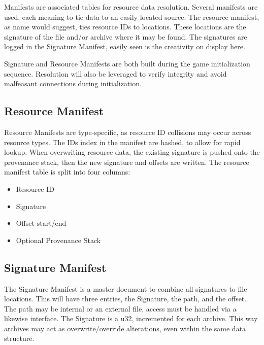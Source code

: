Manifests are associated tables for resource data resolution. Several manifests are used, each meaning to tie data to an easily located source. The resource manifest, as name would suggest, ties resource IDs to locations. These locations are the signature of the file and/or archive where it may be found. The signatures are logged in the Signature Manifest, easily seen is the creativity on display here.

Signature and Resource Manifests are both built during the game initialization sequence. Resolution will also be leveraged to verify integrity and avoid malfeasant connections during initialization. 


\subsection{Resource Manifest}
Resource Manifests are type-specific, as resource ID collisions may occur across resource types. The IDs index in the manifest are hashed, to allow for rapid lookup. When overwriting resource data, the existing signature is pushed onto the provenance stack, then the new signature and offsets are written.
The resource manifest table is split into four columns:

\begin{itemize}
    \item Resource ID
    \item Signature
    \item Offset start/end
    \item Optional Provenance Stack
\end{itemize}

\subsection{Signature Manifest}
The Signature Manifest is a master document to combine all signatures to file locations. This will have three entries, the Signature, the path, and the offset. The path may be internal or an external file, access must be handled via a likewise interface. The Signature is a u32, incremented for each archive. This way archives may act as overwrite/override alterations, even within the same data structure.




